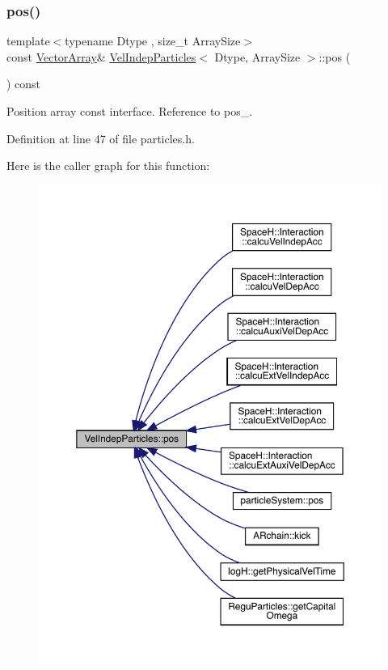 \subsubsection{\texorpdfstring{pos()}{pos()}\hspace{0.1cm}{\footnotesize\ttfamily [1/2]}}
{\footnotesize\ttfamily template$<$typename Dtype , size\+\_\+t Array\+Size$>$ \\
const \mbox{\hyperlink{class_vel_indep_particles_a27580f65b6523bfb6900520af2e44708}{Vector\+Array}}\& \mbox{\hyperlink{class_vel_indep_particles}{Vel\+Indep\+Particles}}$<$ Dtype, Array\+Size $>$\+::pos (\begin{DoxyParamCaption}{ }\end{DoxyParamCaption}) const\hspace{0.3cm}{\ttfamily [inline]}}



Position array const interface. Reference to pos\+\_\+. 



Definition at line 47 of file particles.\+h.

Here is the caller graph for this function\+:\nopagebreak
\begin{figure}[H]
\begin{center}
\leavevmode
\includegraphics[width=350pt]{class_vel_indep_particles_a3abad5914571496cf4c956647b2bafa8_icgraph}
\end{center}
\end{figure}
\mbox{\label{class_vel_indep_particles_a7a48693c77efda8b2ec9d264603e58d8}} 
